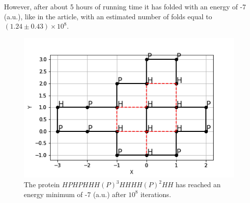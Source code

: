 However, after about 5 hours of running time it has folded with an energy of -7 (a.u.), like in the article, with an estimated number of folds equal to $(1.24 \pm 0.43) \times 10^8$.
\begin{figure}[H]
    \centering
    \includegraphics[width=.75\textwidth]{./img/20_2.png}
    \caption{The protein $HPHPHHH(P)^3HHHH(P)^2HH$ has reached an energy minimum of -7 (a.u.) after $10^8$ iterations.}
    \label{fig:18_2}
\end{figure}